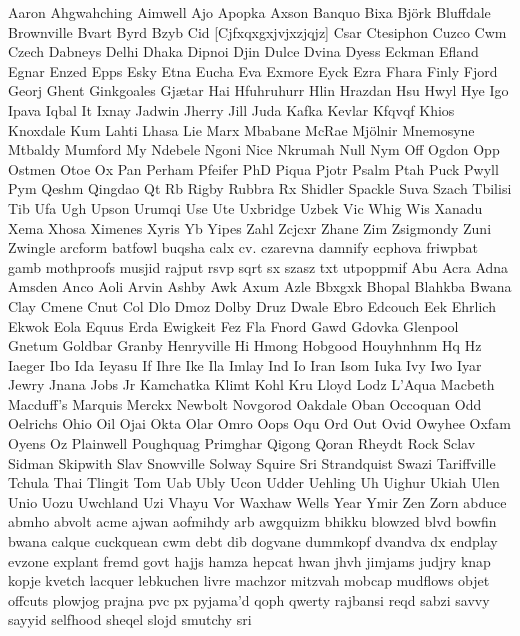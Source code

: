 \documentclass[a4paper,14pt]{memoir}
\begin{document}
Aaron Ahgwahching Aimwell Ajo Apopka Axson Banquo Bixa Björk Bluffdale Brownville Bvart Byrd Bzyb Cid [Cjfxqxgxjvjxzjqjz] Csar Ctesiphon Cuzco Cwm Czech Dabneys Delhi Dhaka Dipnoi Djin Dulce Dvina Dyess Eckman Efland Egnar Enzed Epps Esky Etna Eucha Eva Exmore Eyck Ezra Fhara Finly Fjord Georj Ghent Ginkgoales Gjætar Hai Hfuhruhurr Hlin Hrazdan Hsu Hwyl Hye Igo Ipava Iqbal It Ixnay Jadwin Jherry Jill Juda Kafka Kevlar Kfqvqf Khios Knoxdale Kum Lahti Lhasa Lie Marx Mbabane McRae Mjölnir Mnemosyne Mtbaldy Mumford My Ndebele Ngoni Nice Nkrumah Null Nym Off Ogdon Opp Ostmen Otoe Ox Pan Perham Pfeifer PhD Piqua Pjotr Psalm Ptah Puck Pwyll Pym Qeshm Qingdao Qt Rb Rigby Rubbra Rx Shidler Spackle Suva Szach Tbilisi Tib Ufa Ugh Upson Urumqi Use Ute Uxbridge Uzbek Vic Whig Wis Xanadu Xema Xhosa Ximenes Xyris Yb Yipes Zahl Zcjcxr Zhane Zim Zsigmondy Zuni Zwingle arcform batfowl buqsha calx cv. czarevna damnify ecphova friwpbat gamb mothproofs musjid rajput rsvp sqrt sx szasz txt utpoppmif
Abu Acra Adna Amsden Anco Aoli Arvin Ashby Awk Axum Azle Bbxgxk Bhopal Blahkba Bwana Clay Cmene Cnut Col Dlo Dmoz Dolby Druz Dwale Ebro Edcouch Eek Ehrlich Ekwok Eola Equus Erda Ewigkeit Fez Fla Fnord Gawd Gdovka Glenpool Gnetum Goldbar Granby Henryville Hi Hmong Hobgood Houyhnhnm Hq Hz Iaeger Ibo Ida Ieyasu If Ihre Ike Ila Imlay Ind Io Iran Isom Iuka Ivy Iwo Iyar Jewry Jnana Jobs Jr Kamchatka Klimt Kohl Kru Lloyd Lodz L’Aqua Macbeth Macduff’s Marquis Merckx Newbolt Novgorod Oakdale Oban Occoquan Odd Oelrichs Ohio Oil Ojai Okta Olar Omro Oops Oqu Ord Out Ovid Owyhee Oxfam Oyens Oz Plainwell Poughquag Primghar Qigong Qoran Rheydt Rock Sclav Sidman Skipwith Slav Snowville Solway Squire Sri Strandquist Swazi Tariffville Tchula Thai Tlingit Tom Uab Ubly Ucon Udder Uehling Uh Uighur Ukiah Ulen Unio Uozu Uwchland Uzi Vhayu Vor Waxhaw Wells Year Ymir Zen Zorn abduce abmho abvolt acme ajwan aofmihdy arb awgquizm bhikku blowzed blvd bowfin bwana calque cuckquean cwm debt dib dogvane dummkopf dvandva dx endplay evzone explant fremd govt hajjs hamza hepcat hwan jhvh jimjams judjry knap kopje kvetch lacquer lebkuchen livre machzor mitzvah mobcap mudflows objet offcuts plowjog prajna pvc px pyjama’d qoph qwerty rajbansi reqd sabzi savvy sayyid selfhood sheqel slojd smutchy sri
\end{document}
